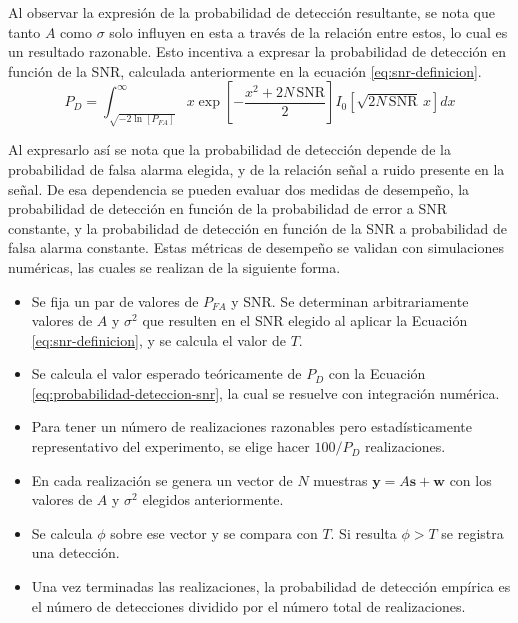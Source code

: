 Al observar la expresión de la probabilidad de detección resultante, se nota que tanto $A$ como $\sigma$ solo influyen en esta a través de la relación entre estos, lo cual es un resultado razonable. Esto incentiva a expresar la probabilidad de detección en función de la SNR, calculada anteriormente en la ecuación \ref{eq:snr-definicion}.
\begin{equation}\label{eq:probabilidad-deteccion-snr}
    P_D = \int_{\sqrt{-2 \ln\left[P_{FA}\right]}}^\infty x\exp\left[-\frac{x^2 + 2N\,\text{SNR}}{2}\right]I_0\left[\sqrt{2N\,\text{SNR}}\,x\right] dx
\end{equation}

Al expresarlo así se nota que la probabilidad de detección depende de la probabilidad de falsa alarma elegida, y de la relación señal a ruido presente en la señal. De esa dependencia se pueden evaluar dos medidas de desempeño, la probabilidad de detección en función de la probabilidad de error a SNR constante, y la probabilidad de detección en función de la SNR a probabilidad de falsa alarma constante. Estas métricas de desempeño se validan con simulaciones numéricas, las cuales se realizan de la siguiente forma. 

\begin{itemize}
    \item Se fija un par de valores de $P_{FA}$ y SNR. Se determinan arbitrariamente valores de $A$ y $\sigma^2$ que resulten en el SNR elegido al aplicar la Ecuación \ref{eq:snr-definicion}, y se calcula el valor de $T$.
    \item Se calcula el valor esperado teóricamente de $P_D$ con la Ecuación \ref{eq:probabilidad-deteccion-snr}, la cual se resuelve con integración numérica.
    \item Para tener un número de realizaciones razonables pero estadísticamente representativo del experimento, se elige hacer $100/P_D$ realizaciones.
    \item En cada realización se genera un vector de $N$ muestras $\mathbf{y} = A\mathbf{s}+\mathbf{w}$ con los valores de $A$ y $\sigma^2$ elegidos anteriormente. 
    \item Se calcula $\phi$ sobre ese vector y se compara con $T$. Si resulta $\phi > T$ se registra una detección.
    \item Una vez terminadas las realizaciones, la probabilidad de detección empírica es el número de detecciones dividido por el número total de realizaciones.
\end{itemize}

